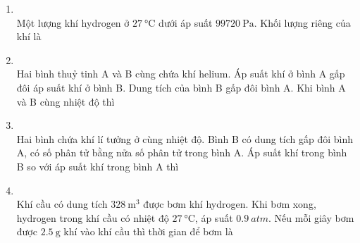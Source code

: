 \begin{enumerate}[label=\bfseries Câu \arabic*:, leftmargin=1.7cm]
\item {}\\
Một lượng khí hydrogen ở $\SI{27}{\celsius}$ dưới áp suất $\SI{99720}{\pascal}$. Khối lượng riêng của khí là

\item {}\\
Hai bình thuỷ tinh A và B cùng chứa khí helium. Áp suất khí ở bình A gấp đôi áp suất khí ở bình B. Dung tích của bình B gấp đôi bình A. Khi bình A và B cùng nhiệt độ thì

\item {}\\
Hai bình chứa khí lí tưởng ở cùng nhiệt độ. Bình B có dung tích gấp đôi bình A, có số phân tử bằng nửa số phân tử trong bình A. Áp suất khí trong bình B so với áp suất khí trong bình A thì


\item{}\\
Khí cầu có dung tích $\SI{328}{\meter^3}$ được bơm khí hydrogen. Khi bơm xong, hydrogen trong khí cầu có nhiệt độ $\SI{27}{\celsius}$, áp suất $\SI{0.9}{atm}$. Nếu mỗi giây bơm được $\SI{2.5}{\gram}$ khí vào khí cầu thì thời gian để bơm là


\end{enumerate}
